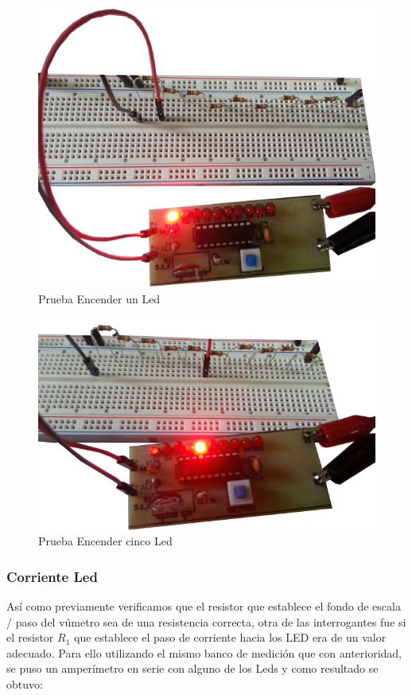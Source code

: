 \documentclass[12pt,a4paper]{article}
\begin{document}
			\begin{figure}[H]
			\centering
				\includegraphics[scale=0.6]{images/res1.png}\caption{Prueba Encender un Led}
			\end{figure}

			\begin{figure}[H]
			\centering
				\includegraphics[scale=0.6]{images/res2.png}\caption{Prueba Encender cinco Led}
			\end{figure}

			\subsubsection{Corriente Led}

			Así como previamente verificamos que el resistor que establece el fondo de escala / paso del vúmetro sea de una resistencia correcta, otra de las interrogantes fue si el resistor $R_1$ que establece el paso de corriente hacia los LED era de un valor adecuado. Para ello utilizando el mismo banco de medición que con anterioridad, se puso un amperímetro en serie con alguno de los Leds y como resultado se obtuvo:
\end{document}
